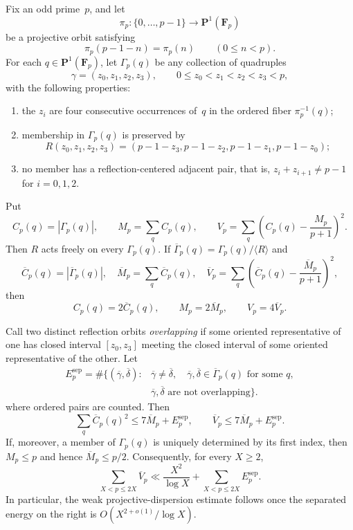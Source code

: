 \begin{proposition}
\label{prop:projective-variance-reduction}
Fix an odd prime~$p$, and let
\[
 \pi_p\colon\{0,\ldots,p-1\}\longrightarrow
 \mathbf P^1(\mathbf F_p)
\]
be a projective orbit satisfying
\[
 \pi_p(p-1-n)=\pi_p(n)
 \qquad(0\le n<p).
\]
For each $q\in\mathbf P^1(\mathbf F_p)$, let $\Gamma_p(q)$ be any
collection of quadruples
\[
 \gamma=(z_0,z_1,z_2,z_3),
 \qquad 0\le z_0<z_1<z_2<z_3<p,
\]
with the following properties:
\begin{enumerate}
 \item the $z_i$ are four consecutive occurrences of~$q$ in the
 ordered fiber $\pi_p^{-1}(q)$;
 \item membership in $\Gamma_p(q)$ is preserved by
 \[
  R(z_0,z_1,z_2,z_3)
  =(p-1-z_3,p-1-z_2,p-1-z_1,p-1-z_0);
 \]
 \item no member has a reflection-centered adjacent pair, that is,
 $z_i+z_{i+1}\ne p-1$ for $i=0,1,2$.
\end{enumerate}
Put
\[
 C_p(q)=|\Gamma_p(q)|,
 \qquad M_p=\sum_q C_p(q),
 \qquad
 V_p=\sum_q\left(C_p(q)-\frac{M_p}{p+1}\right)^2.
\]
Then $R$ acts freely on every $\Gamma_p(q)$.  If
$\overline\Gamma_p(q)=\Gamma_p(q)/\langle R\rangle$ and
\[
 \overline C_p(q)=|\overline\Gamma_p(q)|,
 \quad \overline M_p=\sum_q\overline C_p(q),
 \quad
 \overline V_p=
 \sum_q\left(\overline C_p(q)-\frac{\overline M_p}{p+1}\right)^2,
\]
then
\[
 C_p(q)=2\overline C_p(q),\qquad
 M_p=2\overline M_p,\qquad
 V_p=4\overline V_p.
\]

Call two distinct reflection orbits \emph{overlapping} if some oriented
representative of one has closed interval $[z_0,z_3]$ meeting the closed
interval of some oriented representative of the other.  Let
\[
 \begin{aligned}
 E_p^{\mathrm{sep}}
 =\#\bigl\{(\overline\gamma,\overline\delta):{}&
  \overline\gamma\ne\overline\delta,\quad
  \overline\gamma,\overline\delta\in\overline\Gamma_p(q)
  \text{ for some }q,\\[-2pt]
 &\overline\gamma,\overline\delta\text{ are not overlapping}
 \bigr\}.
 \end{aligned}
\]
where ordered pairs are counted.  Then
\[
 \sum_q\overline C_p(q)^2
 \le 7\overline M_p+E_p^{\mathrm{sep}},
 \qquad
 \overline V_p\le7\overline M_p+E_p^{\mathrm{sep}}.
\]
If, moreover, a member of $\Gamma_p(q)$ is uniquely determined by its
first index, then $M_p\le p$ and hence $\overline M_p\le p/2$.
Consequently, for every $X\ge2$,
\[
 \sum_{X<p\le2X}\overline V_p
 \ll \frac{X^2}{\log X}
      +\sum_{X<p\le2X}E_p^{\mathrm{sep}}.
\]
In particular, the weak projective-dispersion estimate follows once the
separated energy on the right is
$O(X^{2+o(1)}/\log X)$.
\end{proposition}

